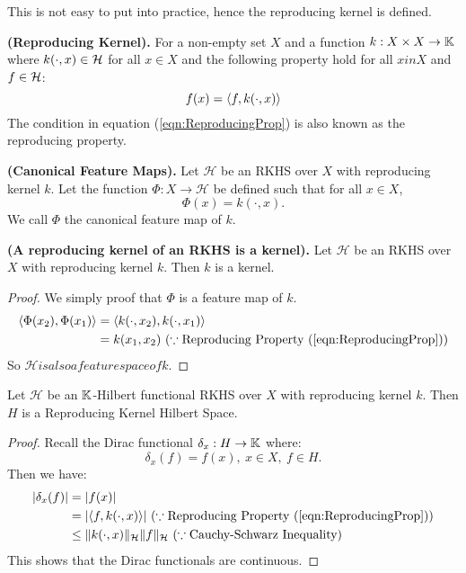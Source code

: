 \documentclass[twoside]{memoir}
\begin{document}
	This is not easy to put into practice, hence the reproducing kernel is defined.
	\begin{defn} \textbf{(Reproducing Kernel).}
		For a non-empty set $X$ and a function $k : X \times X \rightarrow \mathbb{K}$ where $k(\cdot, x) \in \mathcal{H}$ for all $x \in X$ and the following property hold for all $x in X$ and $f \in \mathcal{H}$:
		\begin{equation} \label{eqn:ReproducingProp}
		f(x) = \langle f, k(\cdot, x)\rangle
		\end{equation}
		The condition in equation (\ref{eqn:ReproducingProp}) is also known as the reproducing property.
	\end{defn}
	\begin{defn} \label{def:CanFeatureMaps}
		\textbf{(Canonical Feature Maps).}
		Let $\mathcal{H}$ be an RKHS over $X$ with reproducing kernel $k$. Let the function $\Phi: X \rightarrow \mathcal{H}$ be defined such that for all $x \in X$,
		\[ \Phi(x) = k(\cdot, x). \]
		We call $\Phi$ the canonical feature map of $k$.
	\end{defn}
	\begin{lem}
		\textbf{(A reproducing kernel of an RKHS is a kernel).}
		Let $\mathcal{H}$ be an RKHS over $X$ with reproducing kernel $k$. Then $k$ is a kernel.
	\end{lem}
	\begin{proof}
		We simply proof that $\Phi$ is a feature map of $k$.
		\begin{equation*}
		\begin{split}
		\langle\Phi(x_2), \Phi(x_1)\rangle &= \langle k(\cdot, x_2), k(\cdot, x_1)\rangle \\
		&=  k(x_1, x_2) ~ (\because \text{Reproducing Property } (\ref{eqn:ReproducingProp}))
		\end{split}
		\end{equation*}
		So $\mathcal{H} is also a feature space of k$.
	\end{proof}
	\begin{lem}
		Let $\mathcal{H}$ be an $\mathbb{K}$-Hilbert functional RKHS over $X$ with reproducing kernel $k$. Then $H$ is a Reproducing Kernel Hilbert Space.
	\end{lem}
	\begin{proof}
		Recall the Dirac functional $\delta_x: H \rightarrow \mathbb{K}$ where:
		\[ \delta_x(f) = f(x), ~ x \in X, ~ f \in H. \]
		Then we have:
		\begin{equation*}
		\begin{split}
		|\delta_x(f)| &= |f(x)| \\
		&= |\langle f, k(\cdot, x)\rangle| ~ (\because \text{Reproducing Property }(\ref{eqn:ReproducingProp})) \\
		&\leq \lVert k(\cdot, x)\rVert_\mathcal{H} \lVert f\rVert_
		\mathcal{H} ~ (\because \text{Cauchy-Schwarz Inequality}) \\
		\end{split}
		\end{equation*}
		This shows that the Dirac functionals are continuous.
	\end{proof}
	
\end{document}
